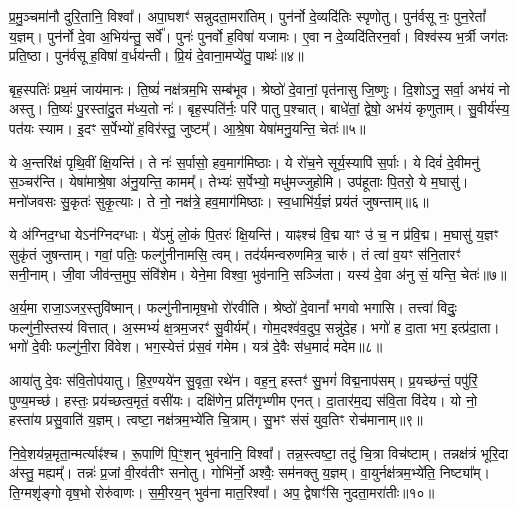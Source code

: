 प्र॒मु॒ञ्चमा॑नौ दुरि॒तानि॒ विश्वा᳚।
अपा॒घशꣳ॑ सन्नुदता॒मरा॑तिम्।
पुन॑र्नो दे॒व्यदि॑तिः स्पृणोतु।
पुन॑र्वसू नः॒ पुन॒रेतां᳚ य॒ज्ञम्।
पुन॑र्नो दे॒वा अ॒भिय॑न्तु॒ सर्वे᳚।
पुनः॑ पुनर्वो ह॒विषा॑ यजामः।
ए॒वा न दे॒व्यदि॑तिरन॒र्वा।
विश्व॑स्य भ॒र्त्री जग॑तः प्रति॒ष्ठा।
पुन॑र्वसू ह॒विषा॑ व॒र्धय॑न्ती।
प्रि॒यं दे॒वाना॒मप्ये॑तु॒ पाथः॑॥४॥

बृह॒स्पतिः॑ प्रथ॒मं जाय॑मानः।
ति॒ष्यं॑ नक्ष॑त्रम॒भि सम्ब॑भूव।
श्रेष्ठो॑ दे॒वानां॒ पृत॑नासु जि॒ष्णुः।
दि॒शोऽनु॒ सर्वा॒ अभ॑यं नो अस्तु।
ति॒ष्यः॑ पु॒रस्ता॑दु॒त म॑ध्य॒तो नः॑।
बृह॒स्पति॑र्नः॒ परि॑ पातु प॒श्चात्।
बाधे॑तां॒ द्वेषो॒ अभ॑यं कृणुताम्।
सु॒वीर्य॑स्य॒ पत॑यः स्याम।
इ॒दꣳ स॒र्पेभ्यो॑ ह॒विर॑स्तु॒ जुष्टम्᳚।
आ॒श्रे॒षा येषा॑मनु॒यन्ति॒ चेतः॑॥५॥

ये अ॒न्तरि॑क्षं पृथि॒वीं क्षि॒यन्ति॑।
ते नः॑ स॒र्पासो॒ हव॒माग॑मिष्ठाः।
ये रो॑च॒ने सूर्य॒स्यापि॑ स॒र्पाः।
ये दिवं॑ दे॒वीमनु॑ स॒ञ्चर॑न्ति।
येषा॑माश्रे॒षा अ॑नु॒यन्ति॒ कामम्᳚।
तेभ्यः॑ स॒र्पेभ्यो॒ मधु॑मज्जुहोमि।
उप॑हूताः पि॒तरो॒ ये म॒घासु॑।
मनो॑जवसः सु॒कृतः॑ सुकृ॒त्याः।
ते नो॒ नक्ष॑त्रे॒ हव॒माग॑मिष्ठाः।
स्व॒धाभि॑र्य॒ज्ञं प्रय॑तं जुषन्ताम्॥६॥

ये अ॑ग्निद॒ग्धा येऽन॑ग्निदग्धाः।
ये॑ऽमुं लो॒कं पि॒तरः॑ क्षि॒यन्ति॑।
याꣴश्च॑ वि॒द्म याꣳ उ॑ च॒ न प्र॑वि॒द्म।
म॒घासु॑ य॒ज्ञꣳ सुकृ॑तं जुषन्ताम्।
गवां॒ पतिः॒ फल्गु॑नीनामसि॒ त्वम्।
तद॑र्यमन्वरुणमित्र॒ चारु॑।
तं त्वा॑ व॒यꣳ स॑नि॒तारꣳ॑ सनी॒नाम्।
जी॒वा जीव॑न्त॒मुप॒ संवि॑शेम।
येने॒मा विश्वा॒ भुव॑नानि॒ सञ्जि॑ता।
यस्य॑ दे॒वा अ॑नु सं॒ यन्ति॒ चेतः॑॥७॥

अ॒र्य॒मा राजा॒\-ऽजर॒स्तुवि॑ष्मान्।
फल्गु॑नीनामृष॒भो रो॑रवीति।
श्रेष्ठो॑ दे॒वानां᳚ भगवो भगासि।
तत्त्वा॑ विदुः॒ फल्गु॑नी॒स्तस्य॑ वित्तात्।
अ॒स्मभ्यं॑ क्ष॒त्रम॒जरꣳ॑ सु॒वीर्यम्᳚।
गोम॒दश्व॑व॒दुप॒ सन्नु॑\-दे॒ह।
भगो॑ ह दा॒ता भग॒ इत्प्र॑दा॒ता।
भगो॑ दे॒वीः फल्गु॑नी॒रा वि॑वेश।
भग॒स्येत्तं प्र॑स॒वं ग॑मेम।
यत्र॑ दे॒वैः स॑ध॒मादं॑ मदेम॥८॥

आया॑तु दे॒वः स॑वि॒तोप॑यातु।
हि॒र॒ण्यये॑न सु॒वृता॒ रथे॑न।
वह॒न्॒ हस्तꣳ॑ सु॒भगं॑ विद्म॒नाप॑सम्।
प्र॒यच्छ॑न्तं॒ पपु॑रिं॒ पुण्य॒मच्छ॑।
हस्तः॒ प्रय॑च्छत्व॒मृतं॒ वसी॑यः।
दक्षि॑णेन॒ प्रति॑\-गृभ्णीम एनत्।
दा॒तार॑म॒द्य स॑वि॒ता वि॑देय।
यो नो॒ हस्ता॑य प्रसु॒वाति॑ य॒ज्ञम्।
त्वष्टा॒ नक्ष॑त्रम॒भ्ये॑ति चि॒त्राम्।
सु॒भꣳ स॑सं युव॒तिꣳ रोच॑मानाम्॥९॥

नि॒वे॒शय॑न्न॒\-मृता॒न्मर्त्याꣴ॑श्च।
रू॒पाणि॑ पि॒ꣳ॒शन् भुव॑नानि॒ विश्वा᳚।
तन्न॒स्त्वष्टा॒ तदु॑ चि॒त्रा विच॑ष्टाम्।
तन्नक्ष॑त्रं भूरि॒दा अ॑स्तु॒ मह्यम्᳚।
तन्नः॑ प्र॒जां वी॒रव॑तीꣳ सनोतु।
गोभि॑र्नो॒ अश्वैः॒ सम॑नक्तु य॒ज्ञम्।
वा॒युर्नक्ष॑त्रम॒भ्ये॑ति॒ निष्ट्या᳚म्।
ति॒ग्मशृ॑ङ्गो वृष॒भो रोरु॑वाणः।
स॒मी॒रय॒न् भुव॑ना मात॒रिश्वा᳚।
अप॒ द्वेषाꣳ॑सि नुदता॒मरा॑तीः॥१०॥

